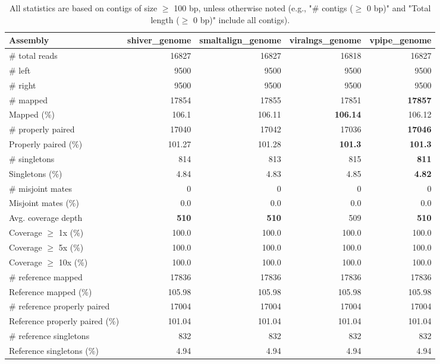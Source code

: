 \documentclass[12pt,a4paper]{article}
\begin{document}
\begin{table}[ht]
\begin{center}
\caption{All statistics are based on contigs of size $\geq$ 100 bp, unless otherwise noted (e.g., "\# contigs ($\geq$ 0 bp)" and "Total length ($\geq$ 0 bp)" include all contigs).}
\begin{tabular}{|l*{4}{|r}|}
\hline
Assembly & shiver\_genome & smaltalign\_genome & viralngs\_genome & vpipe\_genome \\ \hline
\# total reads & 16827 & 16827 & 16818 & 16827 \\ \hline
\# left & 9500 & 9500 & 9500 & 9500 \\ \hline
\# right & 9500 & 9500 & 9500 & 9500 \\ \hline
\# mapped & 17854 & 17855 & 17851 & {\bf 17857} \\ \hline
Mapped (\%) & 106.1 & 106.11 & {\bf 106.14} & 106.12 \\ \hline
\# properly paired & 17040 & 17042 & 17036 & {\bf 17046} \\ \hline
Properly paired (\%) & 101.27 & 101.28 & {\bf 101.3} & {\bf 101.3} \\ \hline
\# singletons & 814 & 813 & 815 & {\bf 811} \\ \hline
Singletons (\%) & 4.84 & 4.83 & 4.85 & {\bf 4.82} \\ \hline
\# misjoint mates & 0 & 0 & 0 & 0 \\ \hline
Misjoint mates (\%) & 0.0 & 0.0 & 0.0 & 0.0 \\ \hline
Avg. coverage depth & {\bf 510} & {\bf 510} & 509 & {\bf 510} \\ \hline
Coverage $\geq$ 1x (\%) & 100.0 & 100.0 & 100.0 & 100.0 \\ \hline
Coverage $\geq$ 5x (\%) & 100.0 & 100.0 & 100.0 & 100.0 \\ \hline
Coverage $\geq$ 10x (\%) & 100.0 & 100.0 & 100.0 & 100.0 \\ \hline
\# reference mapped & 17836 & 17836 & 17836 & 17836 \\ \hline
Reference mapped (\%) & 105.98 & 105.98 & 105.98 & 105.98 \\ \hline
\# reference properly paired & 17004 & 17004 & 17004 & 17004 \\ \hline
Reference properly paired (\%) & 101.04 & 101.04 & 101.04 & 101.04 \\ \hline
\# reference singletons & 832 & 832 & 832 & 832 \\ \hline
Reference singletons (\%) & 4.94 & 4.94 & 4.94 & 4.94 \\ \hline

\end{tabular}
\end{center}
\end{table}
\end{document}
